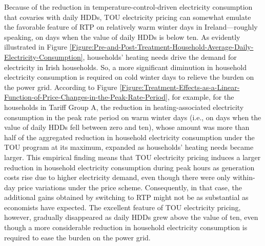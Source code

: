 Because of the reduction in temperature-control-driven electricity consumption that covaries with daily HDDs, TOU electricity pricing can somewhat emulate the favorable feature of RTP on relatively warm winter days in Ireland---roughly speaking, on days when the value of daily HDDs is below ten. As evidently illustrated in Figure 
\ref{Figure:Pre-and-Post-Treatment-Household-Average-Daily-Electricity-Consumption}, 
households' heating needs drive the demand for electricity in Irish households. So, a more significant diminution in household electricity consumption is required on cold winter days to relieve the burden on the power grid. According to Figure \ref{Figure:Treatment-Effects-as-a-Linear-Function-of-Price-Changes-in-the-Peak-Rate-Period}, for example, for the households in Tariff Group A, the reduction in heating-associated electricity consumption in the peak rate period on warm winter days (i.e., on days when the value of daily HDDs fell between zero and ten), whose amount was more than half of the aggregated reduction in household electricity consumption under the TOU program at its maximum, expanded as households' heating needs became larger. This empirical finding means that TOU electricity pricing induces a larger reduction in household electricity consumption during peak hours as generation costs rise due to higher electricity demand, even though there were only within-day price variations under the price scheme. Consequently, in that case, the additional gains obtained by switching to RTP might not be as substantial as economists have expected. The excellent feature of TOU electricity pricing, however, gradually disappeared as daily HDDs grew above the value of ten, even though a more considerable reduction in household electricity consumption is required to ease the burden on the power grid. 
